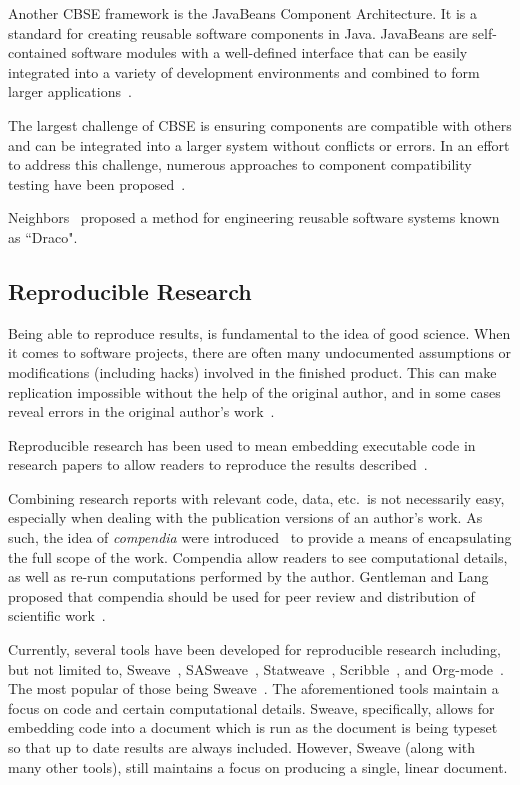 Another CBSE framework is the JavaBeans Component Architecture. It is a 
standard for creating reusable software components in Java. JavaBeans are 
self-contained software modules with a well-defined interface that can be 
easily integrated into a variety of development environments and combined to 
form larger applications~\cite{OracleJavaBeans}.

The largest challenge of CBSE is ensuring components are compatible with others 
and can be integrated into a larger system without conflicts or errors. In an 
effort to address this challenge, numerous approaches to component 
compatibility testing have been proposed~\cite{Wu2001}.

Neighbors~\cite{Neighbors1980, Neighbors1984,Neighbors1989} proposed a method 
for engineering reusable software systems known as ``Draco".  

\subsection{Reproducible Research}

Being able to reproduce results, is fundamental to the idea of good science.
When it comes to software projects, there are often many undocumented
assumptions or modifications (including hacks) involved in the finished product.
This can make replication impossible without the help of the original author,
and in some cases reveal errors in the original author's
work~\cite{IonescuAndJansson2013}.

Reproducible research has been used to mean embedding executable code in
research papers to allow readers to reproduce the results
described~\cite{SchulteEtAl2012}.

Combining research reports with relevant code, data, etc.\ is not necessarily
easy, especially when dealing with the publication versions of an author's work.
As such, the idea of \emph{compendia} were
introduced~\cite{GentlemanAndLang2012} to provide a means of encapsulating the
full scope of the work. Compendia allow readers to see computational details, as
well as re-run computations performed by the author. Gentleman and Lang proposed
that compendia should be used for peer review and distribution of scientific
work~\cite{GentlemanAndLang2012}.

Currently, several tools have been developed for reproducible research
including, but not limited to, Sweave~\cite{Leisch2002},
SASweave~\cite{LenthEtAl2007}, Statweave~\cite{Lenth2009},
Scribble~\cite{FlattEtAl2009}, and Org-mode~\cite{SchulteEtAl2012}. The most
popular of those being Sweave~\cite{SchulteEtAl2012}. The aforementioned tools
maintain a focus on code and certain computational details. Sweave,
specifically, allows for embedding code into a document which is run as the
document is being typeset so that up to date results are always included.
However, Sweave (along with many other tools), still maintains a focus on
producing a single, linear document. 

